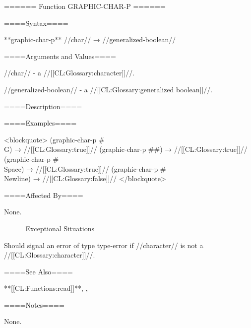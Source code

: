====== Function GRAPHIC-CHAR-P ======

====Syntax====

**graphic-char-p** //char// → //generalized-boolean//

====Arguments and Values====

//char// - a //[[CL:Glossary:character]]//.

//generalized-boolean// - a //[[CL:Glossary:generalized boolean]]//.

====Description====


====Examples====

<blockquote> (graphic-char-p #\\G) → //[[CL:Glossary:true]]// (graphic-char-p #\#) → //[[CL:Glossary:true]]// (graphic-char-p #\\Space) → //[[CL:Glossary:true]]// (graphic-char-p #\\Newline) → //[[CL:Glossary:false]]// </blockquote>

====Affected By====

None.

====Exceptional Situations====

Should signal an error of type type-error if //character// is not a //[[CL:Glossary:character]]//.

====See Also====

**[[CL:Functions:read]]**, {\secref\CharacterSyntax}, {\secref\ImplementationDefinedScripts}

====Notes====

None.

